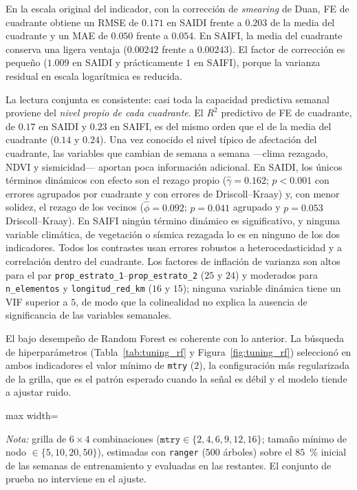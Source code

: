 En la escala original del indicador, con la corrección de \emph{smearing} de Duan, FE de cuadrante obtiene un RMSE de $0{.}171$ en SAIDI frente a $0{.}203$ de la media del cuadrante y un MAE de $0{.}050$ frente a $0{.}054$. En SAIFI, la media del cuadrante conserva una ligera ventaja ($0{.}00242$ frente a $0{.}00243$). El factor de corrección es pequeño ($1{.}009$ en SAIDI y prácticamente $1$ en SAIFI), porque la varianza residual en escala logarítmica es reducida.

La lectura conjunta es consistente: casi toda la capacidad predictiva semanal proviene del \textit{nivel propio de cada cuadrante}. El $R^2$ predictivo de FE de cuadrante, de $0{.}17$ en SAIDI y $0{.}23$ en SAIFI, es del mismo orden que el de la media del cuadrante ($0{.}14$ y $0{.}24$). Una vez conocido el nivel típico de afectación del cuadrante, las variables que cambian de semana a semana ---clima rezagado, NDVI y sismicidad--- aportan poca información adicional. En SAIDI, los únicos términos dinámicos con efecto son el rezago propio ($\hat\gamma=0{.}162$; $p<0{.}001$ con errores agrupados por cuadrante y con errores de Driscoll--Kraay) y, con menor solidez, el rezago de los vecinos ($\hat\phi=0{.}092$; $p=0{.}041$ agrupado y $p=0{.}053$ Driscoll--Kraay). En SAIFI ningún término dinámico es significativo, y ninguna variable climática, de vegetación o sísmica rezagada lo es en ninguno de los dos indicadores. Todos los contrastes usan errores robustos a heterocedasticidad y a correlación dentro del cuadrante. Los factores de inflación de varianza son altos para el par \texttt{prop\_estrato\_1}--\texttt{prop\_estrato\_2} ($25$ y $24$) y moderados para \texttt{n\_elementos} y \texttt{longitud\_red\_km} ($16$ y $15$); ninguna variable dinámica tiene un VIF superior a $5$, de modo que la colinealidad no explica la ausencia de significancia de las variables semanales.

El bajo desempeño de Random Forest es coherente con lo anterior. La búsqueda de hiperparámetros (Tabla~\ref{tab:tuning_rf} y Figura~\ref{fig:tuning_rf}) seleccionó en ambos indicadores el valor mínimo de \texttt{mtry} ($2$), la configuración más regularizada de la grilla, que es el patrón esperado cuando la señal es débil y el modelo tiende a ajustar ruido.

\begin{table}[!htbp]
\centering
\small
\caption{Ajuste de hiperparámetros del Random Forest: mejores configuraciones según la validación temporal interna}
\label{tab:tuning_rf}
\begin{adjustbox}{max width=\linewidth}

\end{adjustbox}

\vspace{2pt}
\noindent\footnotesize\textit{Nota:} grilla de $6\times4$ combinaciones ($\texttt{mtry}\in\{2,4,6,9,12,16\}$; tamaño mínimo de nodo $\in\{5,10,20,50\}$), estimadas con \texttt{ranger} ($500$ árboles) sobre el $85$~\% inicial de las semanas de entrenamiento y evaluadas en las restantes. El conjunto de prueba no interviene en el ajuste.
\end{table}

